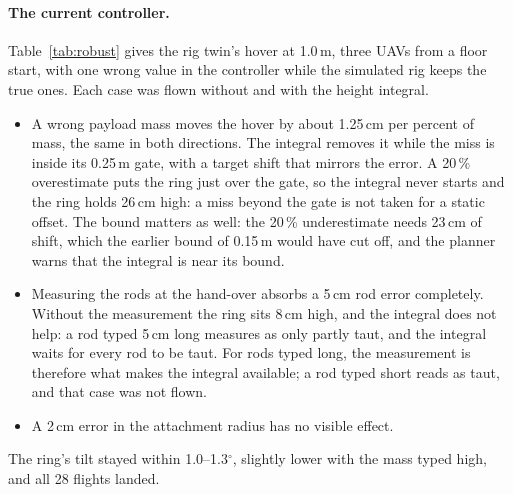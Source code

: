 \paragraph{The current controller.} Table~\ref{tab:robust} gives the rig twin's hover at 1.0\,m, three
UAVs from a floor start, with one wrong value in the controller while the simulated rig keeps the true
ones. Each case was flown without and with the height integral.
\begin{itemize}
    \item A wrong payload mass moves the hover by about 1.25\,cm per percent of mass, the same in
    both directions. The integral removes it while the miss is inside its 0.25\,m gate, with a target
    shift that mirrors the error. A 20\,\% overestimate puts the ring just over the gate, so the
    integral never starts and the ring holds 26\,cm high: a miss beyond the gate is not taken for a
    static offset.
    The bound matters as well: the 20\,\% underestimate needs 23\,cm of shift, which
    the earlier bound of 0.15\,m would have cut off, and the planner warns that the integral is near
    its bound.
    \item Measuring the rods at the hand-over absorbs a 5\,cm rod error completely. Without the
    measurement the ring sits 8\,cm high, and the integral does not help: a rod typed 5\,cm long
    measures as only partly taut, and the integral waits for every rod to be taut. For rods typed
    long, the measurement is therefore what makes the integral available; a rod typed short reads as
    taut, and that case was not flown.
    \item A 2\,cm error in the attachment radius has no visible effect.
\end{itemize}
The ring's tilt stayed within 1.0--1.3$^\circ$, slightly lower with the mass typed high, and all 28
flights landed.

\begin{table}[htbp]
\centering
\caption[Hover with a wrong model]{Hover at 1.0\,m with one wrong value in the controller's model,
Gazebo rig twin, three UAVs, $\epsilon = 0$, floor start. Each cell is the mean of two runs. Target
shift: the integral's correction to the height target at LAND. Tilt: mean over the four runs.
Landed: flights that landed without a tip. $^a$~The miss is over the integral's 0.25\,m gate, so the
integral never starts. $^b$~The unmeasured rods read as partly slack, so the integral's tautness
gate stays closed.}
\label{tab:robust}

\end{table}

